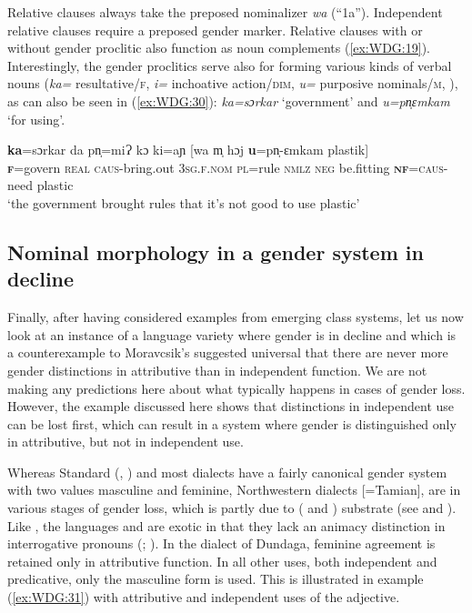 \documentclass[output=collectionpaper]{langsci/langscibook}
\begin{document}
Relative clauses always take the preposed nominalizer \textit{wa} (``1a''). Independent relative clauses require a preposed gender marker. Relative clauses with or without gender proclitic also function as noun complements (\ref{ex:WDG:19}). Interestingly, the gender proclitics serve also for forming various kinds of verbal nouns (\textit{ka=} resultative/\textsc{f}, \textit{i=} inchoative action/\textsc{dim}, \textit{u=} purposive nominals/\textsc{m}, \citealt[71]{Ring2015}), as can also be seen in (\ref{ex:WDG:30}): \textit{ka=sɔrkar} `government' and \textit{u=pn̩ɛmkam} `for using'.

\ea
\label{ex:WDG:30}
\gll \textbf{ka}=sɔrkar	da	pn̩=miɁ	kɔ	ki=aɲ	[wa	m̩	hɔj	\textbf{u}=pn̩-ɛmkam	plastik]\\
\textbf{\textsc{f}}=govern	\textsc{real}	\textsc{caus}-bring.out	3\textsc{sg.f.nom}	\textsc{pl}=rule \textsc{nmlz}	\textsc{neg}	be.fitting	\textbf{\textsc{nf}}=\textsc{caus}-need	plastic\\
\glt	`the government brought rules that it's not good to use plastic'\\
\z


  \subsection{Nominal morphology in a gender system in decline}
  \label{sec:WDG:4.4}

Finally, after having considered examples from emerging class systems, let us now look at an instance of a language variety where gender is in decline and which is a counterexample to Moravcsik's suggested universal that there are never more gender distinctions in attributive than in independent function. We are not making any predictions here about what typically happens in cases of gender loss. However, the example discussed here shows that distinctions in independent use can be lost first, which can result in a system where gender is distinguished only in attributive, but not in independent use.

Whereas Standard  (, ) and most  dialects have a fairly canonical gender system with two values masculine and feminine, Northwestern  dialects [=Tamian], are in various stages of gender loss, which is partly due to  ( and ) substrate (see \citealt{Waelchli2017} and ). Like , the  languages  and  are exotic in that they lack an animacy distinction in interrogative pronouns (\citealt{Nau1999}; \citealt{Lindstrom1995}). In the dialect of Dundaga, feminine agreement is retained only in attributive function. In all other uses, both independent and predicative, only the masculine form is used. This is illustrated in example (\ref{ex:WDG:31}) with attributive and independent uses of the adjective.
\end{document}
